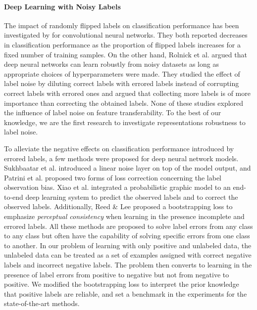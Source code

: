 
\paragraph{Deep Learning with Noisy Labels}

The impact of randomly flipped labels on classification performance has been investigated by \cite{sukhbaatar2014training,patrini2016making} for convolutional neural networks.
They both reported decreases in classification performance as the proportion of flipped labels increases for a fixed number of training samples.
On the other hand, Rolnick et al. \cite{rolnick2017deep} argued that deep neural networks can learn robustly from noisy datasets as long as appropriate choices of hyperparameters were made.
They studied the effect of label noise by diluting correct labels with errored labels instead of corrupting correct labels with errored ones and argued that collecting more labels is of more importance than correcting the obtained labels.
None of these studies explored the influence of label noise on feature transferability.
To the best of our knowledge, we are the first research to investigate representations robustness to label noise.

To alleviate the negative effects on classification performance introduced by errored labels, a few methods were proposed for deep neural network models.
Sukhbaatar et al. \cite{sukhbaatar2014training} introduced a linear noise layer on top of the model output, and Patrini et al. \cite{patrini2016making} proposed two forms of loss correction concerning the label observation bias.
Xiao et al. \cite{xiao2015learning} integrated a probabilistic graphic model to an end-to-end deep learning system to predict the observed labels and to correct the observed labels.
Additionally, Reed \& Lee \cite{reed2014training} proposed a bootstrapping loss to emphasize \textit{perceptual consistency} when learning in the presence incomplete and errored labels.
All these methods are proposed to solve label errors from any class to any class but often have the capability of solving specific errors from one class to another.
In our problem of learning with only positive and unlabeled data, the unlabeled data can be treated as a set of examples assigned with correct negative labels and incorrect negative labels.
The problem then converts to learning in the presence of label errors from positive to negative but not from negative to positive.
We modified the bootstrapping loss to interpret the prior knowledge that positive labels are reliable, and set a benchmark in the experiments for the state-of-the-art methods.

